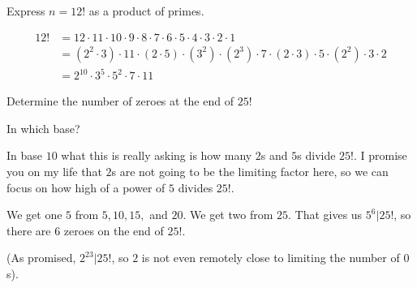 \documentclass[../main.tex]{subfiles}
\begin{document}
\begin{ex} \label{2.10}
  Express $n = 12!$ as a product of primes.
\end{ex}

\begin{align*}
  12! &= 12 \cdot 11 \cdot 10 \cdot 9 \cdot 8 \cdot 7 \cdot 6 \cdot 5 \cdot 4 \cdot 3 \cdot 2 \cdot 1 \\
      &= (2^2 \cdot 3) \cdot 11 \cdot (2 \cdot 5) \cdot (3^2) \cdot (2^3) \cdot 7 \cdot (2 \cdot 3) \cdot 5 \cdot (2^2) \cdot 3 \cdot 2 \\
      &= 2^{10} \cdot 3^5 \cdot 5^2 \cdot 7 \cdot 11
\end{align*}



\begin{ex} \label{2.11}
  Determine the number of zeroes at the end of $25!$
\end{ex}

In which base?

In base $10$ what this is really asking is how many $2$s and $5$s divide $25!$. I promise you on my life that $2$s are not going to be the limiting factor here, so we can focus on how high of a power of $5$ divides $25!$.

We get one $5$ from $5, 10, 15,$ and $20$. We get two from $25$. That gives us $5^6 | 25!$, so there are $6$ zeroes on the end of $25!$.

(As promised, $2^{23} | 25!$, so $2$ is not even remotely close to limiting the number of $0$s).
\end{document}
